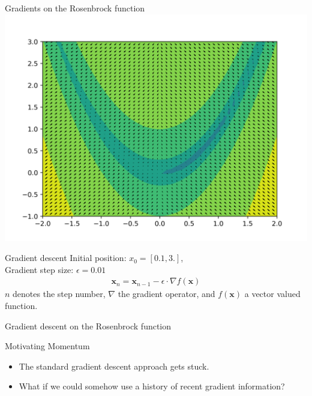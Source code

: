 \documentclass{beamer}
\begin{document}
    \begin{frame}{Gradients on the Rosenbrock function}
      \includegraphics[width=.9\linewidth]{./figures/quiver.png}
    \end{frame}

    \begin{frame}{Gradient descent}
      Initial position: $x_0 = [0.1, 3.]$, \\
      Gradient step size: $\epsilon = 0.01 $
      \begin{align}
        \mathbf{x}_n = \mathbf{x}_{n-1} - \epsilon \cdot \nabla f(\mathbf{x})
      \end{align}
      $n$ denotes the step number, $\nabla$ the gradient operator, and $f(\mathbf{x})$ a vector valued function.
    \end{frame}

    \begin{frame}{Gradient descent on the Rosenbrock function}
      \centering
    \end{frame}

    \begin{frame}{Motivating Momentum}
      \begin{itemize}
        \item The standard gradient descent approach gets stuck.
        \item What if we could somehow use a history of recent gradient information?
      \end{itemize}
    \end{frame}
\end{document}
